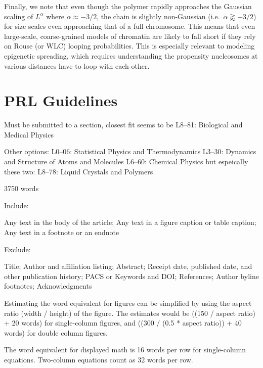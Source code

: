 \documentclass[%
 reprint,
superscriptaddress,
showpacs,preprintnumbers,
 amsmath,amssymb,
 aps,
 prl,
]{revtex4-1}
\begin{document}
Finally, we note that even though the polymer rapidly approaches the Gaussian
    scaling of $L^\alpha$ where $\alpha \approx -3/2$, the chain is slightly
    non-Gaussian (i.e.\ $\alpha \gtrapprox -3/2$) for size scales even
    approaching that of a full chromosome.
This means that even large-scale, coarse-grained models of chromatin are likely
    to fall short if they rely on Rouse (or WLC) looping probabilities.
This is especially relevant to modeling epigenetic spreading, which requires
    understanding the propensity nucleosomes at various distances have to loop with
    each other.

\section{PRL Guidelines}

Must be submitted to a section, closest fit seems to be
L8--81: Biological and Medical Physics

Other options:
L0--06: Statistical Physics and Thermodynamics
L3--30: Dynamics and Structure of Atoms and Molecules
L6--60: Chemical Physics
but espeically these two:
L8--78: Liquid Crystals and Polymers


3750 words

Include:

Any text in the body of the article;
Any text in a figure caption or table caption;
Any text in a footnote or an endnote

Exclude:

Title;
Author and affiliation listing;
Abstract;
Receipt date, published date, and other publication history;
PACS or Keywords and DOI;\@
References;
Author byline footnotes;
Acknowledgments

Estimating the word equivalent for figures can be simplified by using the aspect
ratio (width / height) of the figure. The estimates would be ((150 / aspect
ratio) + 20 words) for single-column figures, and ((300 / (0.5 * aspect ratio))
+ 40 words) for double column figures.

The word equivalent for displayed math is 16 words per row for single-column
equations. Two-column equations count as 32 words per row.


\end{document}

